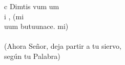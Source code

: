 \begin{cancion}%
	c Dimtis vum um \\
	i , (mi\\
	uum butuunace. mi)\\
	\jump\\
(Ahora Señor, deja partir a tu siervo,\\
 según tu Palabra)\\
\end{cancion}%
